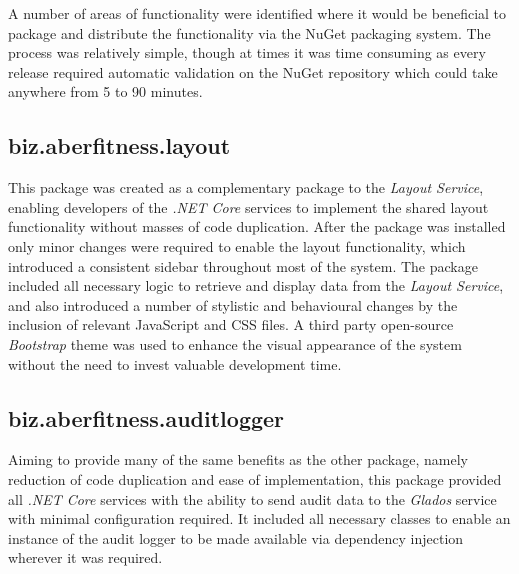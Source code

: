 A number of areas of functionality were identified where it would be beneficial to package and distribute the functionality via the NuGet packaging system.  The process was relatively simple, though at times it was time consuming as every release required automatic validation on the NuGet repository which could take anywhere from 5 to 90 minutes.

\subsection{biz.aberfitness.layout}
This package was created as a complementary package to the \textit{Layout Service}, enabling developers of the \textit{.NET Core} services to implement the shared layout functionality without masses of code duplication.  After the package was installed only minor changes were required to enable the layout functionality, which introduced a consistent sidebar throughout most of the system.  The package included all necessary logic to retrieve and display data from the \textit{Layout Service}, and also introduced a number of stylistic and behavioural changes by the inclusion of relevant JavaScript and CSS files.  A third party open-source \textit{Bootstrap} theme\cite{elaadmin} was used to enhance the visual appearance of the system without the need to invest valuable development time.

\subsection{biz.aberfitness.auditlogger}
Aiming to provide many of the same benefits as the other package, namely reduction of code duplication and ease of implementation, this package provided all \textit{.NET Core} services with the ability to send audit data to the \textit{Glados} service with minimal configuration required.  It included all necessary classes to enable an instance of the audit logger to be made available via dependency injection wherever it was required.
